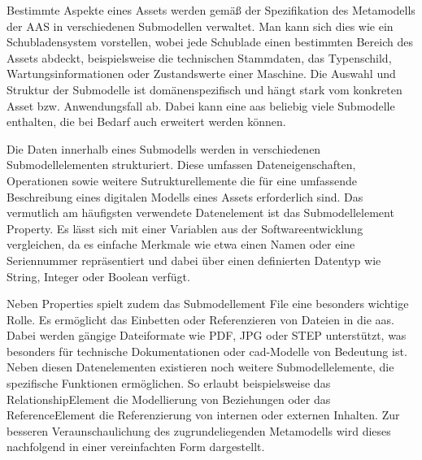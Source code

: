 Bestimmte Aspekte eines Assets werden gemäß der Spezifikation des Metamodells der AAS \cite{SpezifikationPart1} in verschiedenen Submodellen verwaltet.
Man kann sich dies wie ein Schubladensystem vorstellen, wobei jede Schublade einen bestimmten Bereich des Assets abdeckt, beispielsweise die technischen Stammdaten, das Typenschild, Wartungsinformationen oder Zustandswerte einer Maschine.
Die Auswahl und Struktur der Submodelle ist domänenspezifisch und hängt stark vom konkreten Asset bzw. Anwendungsfall ab. 
Dabei kann eine \acs{aas} beliebig viele Submodelle enthalten, die bei Bedarf auch erweitert werden können. 

Die Daten innerhalb eines Submodells werden in verschiedenen Submodellelementen strukturiert.
Diese umfassen Dateneigenschaften, Operationen sowie weitere Sutrukturellemente die für eine umfassende Beschreibung eines digitalen Modells eines Assets erforderlich sind.
Das vermutlich am häufigsten verwendete Datenelement ist das Submodellelement Property.
Es lässt sich mit einer Variablen aus der Softwareentwicklung vergleichen, da es einfache Merkmale wie etwa einen Namen oder eine Seriennummer repräsentiert und dabei über einen definierten Datentyp wie String, Integer oder Boolean verfügt.

Neben Properties spielt zudem das Submodellement File eine besonders wichtige Rolle. Es ermöglicht das Einbetten oder Referenzieren von Dateien in die \acs{aas}. 
Dabei werden gängige Dateiformate wie PDF, JPG oder STEP unterstützt, was besonders für technische Dokumentationen oder \acs{cad}-Modelle von Bedeutung ist.
Neben diesen Datenelementen existieren noch weitere Submodellelemente, die spezifische Funktionen ermöglichen. 
So erlaubt beispielsweise das RelationshipElement die Modellierung von Beziehungen oder das ReferenceElement die Referenzierung von internen oder externen Inhalten.
Zur besseren Veraunschaulichung des zugrundeliegenden Metamodells wird dieses nachfolgend in einer vereinfachten Form dargestellt.





